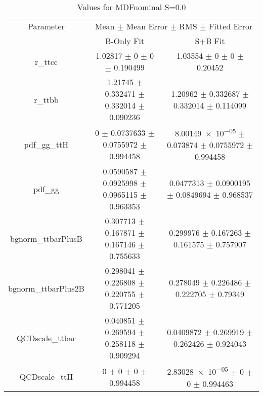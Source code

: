 \begin{table}
\centering
\caption{Values for MDFnominal S=0.0}
\begin{tabular}{ccc}
\toprule
Parameter & \multicolumn{2}{c}{Mean $\pm$ Mean Error $\pm$ RMS $\pm$ Fitted Error}\\
 & B-Only Fit & S+B Fit\\
\midrule
r\_ttcc & \num{1.02817} $\pm$ \num{0} $\pm$ \num{0} $\pm$ \num{0.190499} & \num{1.03554} $\pm$ \num{0} $\pm$ \num{0} $\pm$ \num{0.20452}\\
r\_ttbb & \num{1.21745} $\pm$ \num{0.332471} $\pm$ \num{0.332014} $\pm$ \num{0.090236} & \num{1.20962} $\pm$ \num{0.332687} $\pm$ \num{0.332014} $\pm$ \num{0.114099}\\
pdf\_gg\_ttH & \num{0} $\pm$ \num{0.0737633} $\pm$ \num{0.0755972} $\pm$ \num{0.994458} & \num{8.00149e-05} $\pm$ \num{0.073874} $\pm$ \num{0.0755972} $\pm$ \num{0.994458}\\
pdf\_gg & \num{0.0590587} $\pm$ \num{0.0925998} $\pm$ \num{0.0965115} $\pm$ \num{0.963353} & \num{0.0477313} $\pm$ \num{0.0900195} $\pm$ \num{0.0849694} $\pm$ \num{0.968537}\\
bgnorm\_ttbarPlusB & \num{0.307713} $\pm$ \num{0.167871} $\pm$ \num{0.167146} $\pm$ \num{0.755633} & \num{0.299976} $\pm$ \num{0.167263} $\pm$ \num{0.161575} $\pm$ \num{0.757907}\\
bgnorm\_ttbarPlus2B & \num{0.298041} $\pm$ \num{0.226808} $\pm$ \num{0.220755} $\pm$ \num{0.771205} & \num{0.278049} $\pm$ \num{0.226486} $\pm$ \num{0.222705} $\pm$ \num{0.79349}\\
QCDscale\_ttbar & \num{0.040851} $\pm$ \num{0.269594} $\pm$ \num{0.258118} $\pm$ \num{0.909294} & \num{0.0409872} $\pm$ \num{0.269919} $\pm$ \num{0.262426} $\pm$ \num{0.924043}\\
QCDscale\_ttH & \num{0} $\pm$ \num{0} $\pm$ \num{0} $\pm$ \num{0.994458} & \num{2.83028e-05} $\pm$ \num{0} $\pm$ \num{0} $\pm$ \num{0.994463}\\
\bottomrule
\end{tabular}
\end{table}